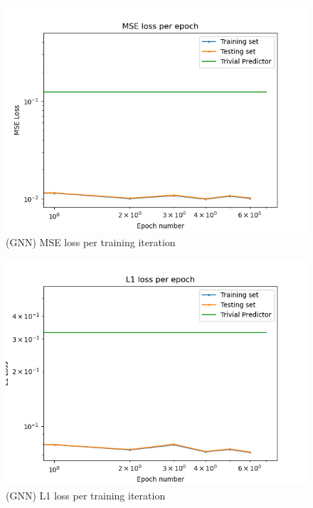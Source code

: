 \begin{figure}[h]
  \centering
  \includegraphics[scale=0.7]{figures/recircflow/gnn_train_mse.png}
  \caption{(GNN) MSE loss per training iteration}
\end{figure}

\begin{figure}[h]
  \centering
  \includegraphics[scale=0.7]{figures/recircflow/gnn_train_l1.png}
  \caption{(GNN) L1 loss per training iteration}
\end{figure}

